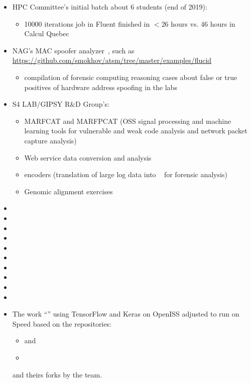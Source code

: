 \begin{itemize}
	\item 
HPC Committee's initial batch about 6 students (end of 2019):
\begin{itemize}
	\item 
10000 iterations job in Fluent finished in $<26$ hours vs. 46 hours in Calcul Quebec
\end{itemize}
	\item 
NAG's MAC spoofer analyzer~\cite{mac-spoofer-analyzer-intro-c3s2e2014,mac-spoofer-analyzer-detail-fps2014},
such as \url{https://github.com/smokhov/atsm/tree/master/examples/flucid}
\begin{itemize}
	\item 
compilation of forensic computing reasoning cases about false or true positives of hardware address spoofing in the labs
\end{itemize}
	\item 
S4 LAB/GIPSY R\&D Group's:
\begin{itemize}
	\item 
MARFCAT and MARFPCAT (OSS signal processing and machine learning tools for 
vulnerable and weak code analysis and network packet capture
analysis)~\cite{marfcat-nlp-ai2014,marfcat-sate2010-nist,fingerprinting-mal-traffic}
	\item 
Web service data conversion and analysis
	\item 
{\flucid} encoders (translation of large log data into {\flucid}~\cite{mokhov-phd-thesis-2013} for forensic analysis)
	\item 
Genomic alignment exercises
\end{itemize}
\item
{}
\item
{}
\item
{}
\item
{}
\item
{}
\item
{}
\item
{}
\item
{}
\item
{}
\item
{}

\item
The work ``'' using TensorFlow and Keras on OpenISS
adjusted to run on Speed based on the repositories:
\begin{itemize}
	\item 
{} and
	\item
{}
\end{itemize}
and theirs forks by the team.

\end{itemize}